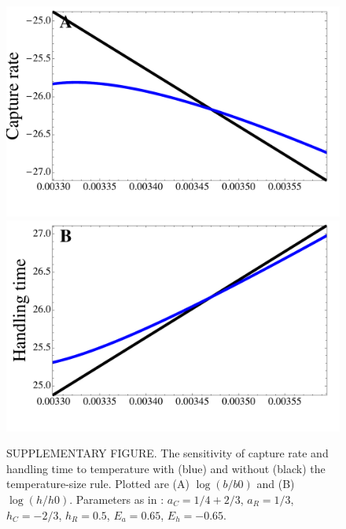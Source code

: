 \documentclass[11pt]{article}
\begin{document}
\begin{figure}[!ht]
\centering
\includegraphics[width=0.5\linewidth]{CaptureTSRAsymm}
\includegraphics[width=0.5\linewidth]{HandlingTSRAsymm}
\caption{
SUPPLEMENTARY FIGURE.
The sensitivity of capture rate and handling time to temperature with (blue) and without (black) the temperature-size rule.
Plotted are (A) $\log(b/b0)$ and (B) $\log(h/h0)$.
Parameters as in \cite{Rall2012}: $a_C = 1/4+2/3$, $a_R = 1/3$, $h_C = -2/3$, $h_R = 0.5$, $E_a = 0.65$, $E_h = -0.65$.
}
\label{TypeII}
\end{figure}
\end{document}
